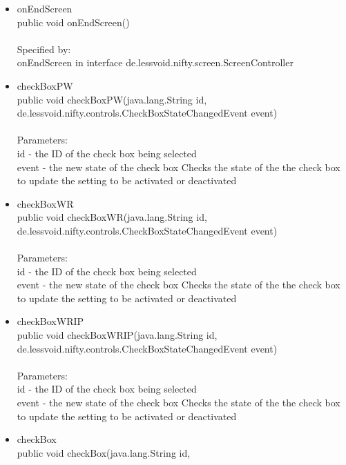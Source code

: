\documentclass[letterpaper]{article}
\begin{document}
\begin{itemize}
\begin{itemize}
											\item	onEndScreen \\
													public void onEndScreen() \\ \\
													Specified by: \\
													onEndScreen in interface de.lessvoid.nifty.screen.ScreenController
											\item	checkBoxPW \\
													public void checkBoxPW(java.lang.String id, \\
				              de.lessvoid.nifty.controls.CheckBoxStateChangedEvent event) \\ \\
													Parameters: \\
													id - the ID of the check box being selected \\
													event - the new state of the check box Checks the state of the the check box to update the setting to be activated or deactivated
											\item	checkBoxWR \\
													public void checkBoxWR(java.lang.String id, \\
				              de.lessvoid.nifty.controls.CheckBoxStateChangedEvent event) \\ \\
													Parameters: \\
													id - the ID of the check box being selected \\
													event - the new state of the check box Checks the state of the the check box to update the setting to be activated or deactivated
											\item	checkBoxWRIP \\
													public void checkBoxWRIP(java.lang.String id, \\
				                de.lessvoid.nifty.controls.CheckBoxStateChangedEvent event) \\ \\
													Parameters: \\
													id - the ID of the check box being selected \\
													event - the new state of the check box Checks the state of the the check box to update the setting to be activated or deactivated
											\item	checkBox \\
													public void checkBox(java.lang.String id, \\

\end{itemize}
\end{itemize}
\end{document}

